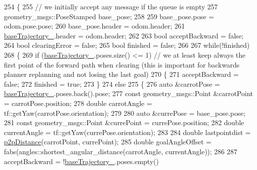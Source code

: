 \begin{DoxyCode}
254         \{
255             \textcolor{comment}{// we initially accept any message if the queue is empty}
257 \textcolor{comment}{}            geometry\_msgs::PoseStamped base\_pose;
258 
259             base\_pose.pose = odom.pose.pose;
260             base\_pose.header = odom.header;
261             \hyperlink{classcl__move__base__z_1_1odom__tracker_1_1OdomTracker_a466d18a86df049f0f680e043bb5ea91f}{baseTrajectory\_}.header = odom.header;
262 
263             \textcolor{keywordtype}{bool} acceptBackward = \textcolor{keyword}{false};
264             \textcolor{keywordtype}{bool} clearingError = \textcolor{keyword}{false};
265             \textcolor{keywordtype}{bool} finished = \textcolor{keyword}{false};
266 
267             \textcolor{keywordflow}{while}(!finished)
268             \{
269                 \textcolor{keywordflow}{if} (\hyperlink{classcl__move__base__z_1_1odom__tracker_1_1OdomTracker_a466d18a86df049f0f680e043bb5ea91f}{baseTrajectory\_}.poses.size() <= 1) \textcolor{comment}{// we at least keep always the first
       point of the forward path when clearing (this is important for backwards planner replanning and not losing
       the last goal)}
270                 \{
271                     acceptBackward = \textcolor{keyword}{false};
272                     finished = \textcolor{keyword}{true};
273                 \}
274                 \textcolor{keywordflow}{else}
275                 \{
276                     \textcolor{keyword}{auto} &carrotPose = \hyperlink{classcl__move__base__z_1_1odom__tracker_1_1OdomTracker_a466d18a86df049f0f680e043bb5ea91f}{baseTrajectory\_}.poses.back().pose;
277                     \textcolor{keyword}{const} geometry\_msgs::Point &carrotPoint = carrotPose.position;
278                     \textcolor{keywordtype}{double} carrotAngle = tf::getYaw(carrotPose.orientation);
279 
280                     \textcolor{keyword}{auto} &currePose = base\_pose.pose;
281                     \textcolor{keyword}{const} geometry\_msgs::Point &currePoint = currePose.position;
282                     \textcolor{keywordtype}{double} currentAngle = tf::getYaw(currePose.orientation);
283 
284                     \textcolor{keywordtype}{double} lastpointdist = \hyperlink{namespacecl__move__base__z_1_1odom__tracker_a501582a760a02ce0069d95bfc67ca973}{p2pDistance}(carrotPoint, currePoint);
285                     \textcolor{keywordtype}{double} goalAngleOffset = fabs(angles::shortest\_angular\_distance(carrotAngle, 
      currentAngle));
286 
287                     acceptBackward = !\hyperlink{classcl__move__base__z_1_1odom__tracker_1_1OdomTracker_a466d18a86df049f0f680e043bb5ea91f}{baseTrajectory\_}.poses.empty() 

\end{DoxyCode}
